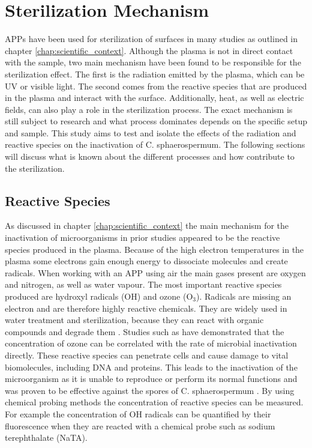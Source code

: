 \section{Sterilization Mechanism}
APPs have been used for sterilization of surfaces in many studies as outlined in chapter \ref{chap:scientific_context}. Although the plasma is not in direct contact with the sample, two main mechanism have been found to be responsible for the sterilization effect. The first is the radiation emitted by the plasma, which can be UV or visible light. The second comes from the reactive species that are produced in the plasma and interact with the surface. Additionally, heat, as well as electric fields, can also play a role in the sterilization process. The exact mechanism is still subject to research and what process dominates depends on the specific setup and sample. This study aims to test and isolate the effects of the radiation and reactive species on the inactivation of C. sphaerospermum. The following sections will discuss what is known about the different processes and how contribute to the sterilization.

\subsection{Reactive Species}
As discussed in chapter \ref{chap:scientific_context} the main mechanism for the inactivation of microorganisms in prior studies appeared to be the reactive species produced in the plasma. Because of the high electron temperatures in the plasma some electrons gain enough energy to dissociate molecules and create radicals. When working with an APP using air the main gases present are oxygen and nitrogen, as well as water vapour. The most important reactive species produced are hydroxyl radicals (OH) and ozone (O$_3$). Radicals are missing an electron and are therefore highly reactive chemicals. They are widely used in water treatment and sterilization, because they can react with organic compounds and degrade them \cite{water}. Studies such as \cite{ozone} have demonstrated that the concentration of ozone can be correlated with the rate of microbial inactivation directly. These reactive species can penetrate cells and cause damage to vital biomolecules, including DNA and proteins.
This leads to the inactivation of the microorganism as it is unable to reproduce or perform its normal functions and was proven to be effective against the spores of C. sphaerospermum \cite{kit}. By using chemical probing methods the concentration of reactive species can be measured. For example the concentration of OH radicals can be quantified by their fluorescence when they are reacted with a chemical probe such as sodium terephthalate (NaTA). 

